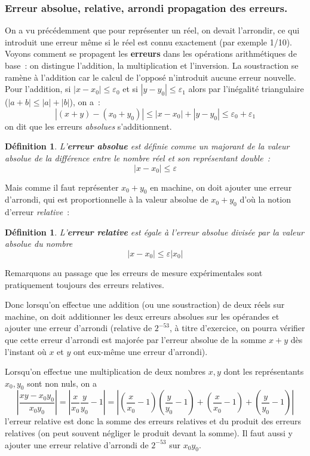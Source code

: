 \documentclass[a4paper,11pt]{article}
\newtheorem{defn}[thm]{D\'efinition}
\begin{document}
\subsubsection{Erreur absolue, relative, arrondi propagation des erreurs.}
On a vu pr\'ec\'edemment que pour repr\'esenter un r\'eel, on devait
l'arrondir, ce qui introduit une erreur m\^eme si le r\'eel est
connu exactement (par exemple 1/10).
Voyons comment se propagent les {\bf erreurs} 
dans les opérations arithmétiques
de base~: on distingue l'addition, la multiplication
et l'inversion. La soustraction se ramène à l'addition car
le calcul de l'opposé n'introduit aucune erreur nouvelle.
Pour l'addition, si $|x -x_0| \leq \varepsilon_0$ et si $|y-y_0| \leq \varepsilon_1$
alors par l'inégalité triangulaire ($|a+b|\leq |a|+|b|$), on a~:
\[ |(x+y)-(x_0+y_0)| \leq |x-x_0| + | y-y_0 | \leq 
\varepsilon_0 + \varepsilon_1 \]
on dit que les erreurs {\em absolues\/} s'additionnent. 
\begin{defn}
L'{\bf erreur absolue}
est définie comme un majorant de la valeur absolue
de la différence entre le nombre réel et
son représentant double~:
\[ |x-x_0| \leq \varepsilon \]
\end{defn}
Mais comme il faut représenter $x_0+y_0$
en machine, on doit ajouter une erreur d'arrondi, qui est
proportionnelle \`a la valeur absolue de $x_0+y_0$ d'o\`u la notion
d'erreur {\em relative}~:
\begin{defn}
L'{\bf erreur relative} 
est égale à l'erreur absolue divisée par
la valeur absolue du nombre
\[ |x-x_0| \leq \varepsilon |x_0| \]
\end{defn}
Remarquons au passage que les erreurs de mesure expérimentales sont 
pratiquement toujours des erreurs relatives.

Donc lorsqu'on effectue une addition (ou une soustraction) de deux réels
sur machine, on doit additionner les deux erreurs absolues sur les opérandes
et ajouter une erreur d'arrondi (relative de $2^{-53}$, à titre
d'exercice, on pourra vérifier que cette erreur
d'arrondi est majorée par l'erreur absolue de la somme 
$x+y$ dès l'instant où
$x$ et $y$ ont eux-même une erreur d'arrondi).

Lorsqu'on effectue une multiplication de deux nombres $x,y$ dont les
représentants $x_0,y_0$ sont non nuls, on a
\[ \left| \frac{xy-x_0 y_0}{x_0 y_0} \right| = 
\left| \frac{x}{x_0} \frac{y}{y_0} -1 \right|
= \left| 
(\frac{x}{x_0}-1)(\frac{y}{y_0} -1)+(\frac{x}{x_0}-1)+(\frac{y}{y_0} -1) 
\right|  \]
l'erreur relative est donc la somme des erreurs relatives et du produit
des erreurs relatives (on peut souvent négliger le produit devant la somme). Il
faut aussi y ajouter une erreur relative d'arrondi de $2^{-53}$ sur $x_0 y_0$.
\end{document}
